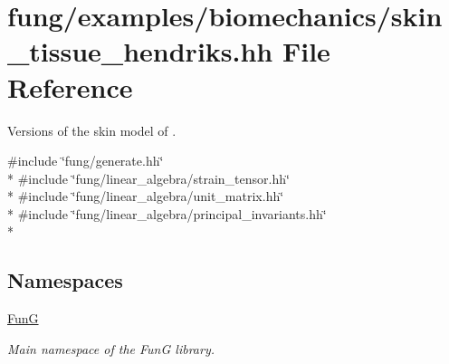 \hypertarget{skin__tissue__hendriks_8hh}{}\section{fung/examples/biomechanics/skin\+\_\+tissue\+\_\+hendriks.hh File Reference}
\label{skin__tissue__hendriks_8hh}


Versions of the skin model of \cite{Hendriks2005}.  


{\ttfamily \#include \char`\"{}fung/generate.\+hh\char`\"{}}\\*
{\ttfamily \#include \char`\"{}fung/linear\+\_\+algebra/strain\+\_\+tensor.\+hh\char`\"{}}\\*
{\ttfamily \#include \char`\"{}fung/linear\+\_\+algebra/unit\+\_\+matrix.\+hh\char`\"{}}\\*
{\ttfamily \#include \char`\"{}fung/linear\+\_\+algebra/principal\+\_\+invariants.\+hh\char`\"{}}\\*
\subsection*{Namespaces}
\begin{DoxyCompactItemize}
\item 
 \hyperlink{namespaceFunG}{Fun\+G}
\begin{DoxyCompactList}\small\item\em Main namespace of the Fun\+G library. \end{DoxyCompactList}\end{DoxyCompactItemize}
